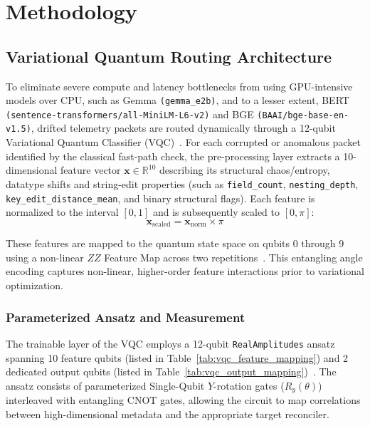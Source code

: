 \documentclass[journal]{IEEEtran}
\begin{document}
\section{Methodology}
\subsection{Variational Quantum Routing Architecture}
To eliminate severe compute and latency bottlenecks from using GPU-intensive models over CPU, such as Gemma \texttt{(gemma\_e2b)}, and to a lesser extent, BERT \texttt{(sentence-transformers/all-MiniLM-L6-v2)} and BGE \texttt{(BAAI/bge-base-en-v1.5)}, drifted telemetry packets are routed dynamically through a 12-qubit Variational Quantum Classifier (VQC)~\cite{Havlicek_2019}.
For each corrupted or anomalous packet identified by the classical fast-path check, the pre-processing layer extracts a 10-dimensional feature vector $\mathbf{x} \in \mathbb{R}^{10}$ describing its structural chaos/entropy, datatype shifts and string-edit properties (such as \texttt{field\_count}, \texttt{nesting\_depth}, \texttt{key\_edit\_distance\_mean}, and binary structural flags). Each feature is normalized to the interval $[0,1]$ and is subsequently scaled to $[0, \pi]$:
\begin{equation}
\mathbf{x}_{\text{scaled}} = \mathbf{x}_{\text{norm}} \times \pi
\end{equation}

These features are mapped to the quantum state space on qubits 0 through 9 using a non-linear $ZZ$ Feature Map across two repetitions~\cite{Havlicek_2019}. This entangling angle encoding captures non-linear, higher-order feature interactions prior to variational optimization.

\subsubsection{Parameterized Ansatz and Measurement}
The trainable layer of the VQC employs a 12-qubit \texttt{RealAmplitudes} ansatz spanning 10 feature qubits (listed in Table~\ref{tab:vqc_feature_mapping}) and 2 dedicated output qubits (listed in Table~\ref{tab:vqc_output_mapping})~\cite{Kandala_2017}. The ansatz consists of parameterized Single-Qubit $Y$-rotation gates ($R_y(\theta)$) interleaved with entangling CNOT gates, allowing the circuit to map correlations between high-dimensional metadata and the appropriate target reconciler.
\end{document}
